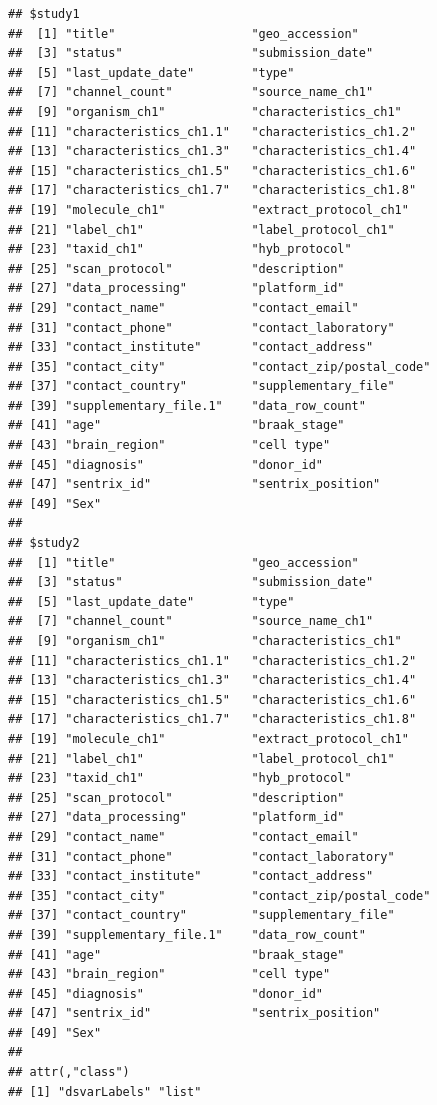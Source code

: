 \documentclass[
]{book}
\begin{document}
\begin{verbatim}
## $study1
##  [1] "title"                   "geo_accession"          
##  [3] "status"                  "submission_date"        
##  [5] "last_update_date"        "type"                   
##  [7] "channel_count"           "source_name_ch1"        
##  [9] "organism_ch1"            "characteristics_ch1"    
## [11] "characteristics_ch1.1"   "characteristics_ch1.2"  
## [13] "characteristics_ch1.3"   "characteristics_ch1.4"  
## [15] "characteristics_ch1.5"   "characteristics_ch1.6"  
## [17] "characteristics_ch1.7"   "characteristics_ch1.8"  
## [19] "molecule_ch1"            "extract_protocol_ch1"   
## [21] "label_ch1"               "label_protocol_ch1"     
## [23] "taxid_ch1"               "hyb_protocol"           
## [25] "scan_protocol"           "description"            
## [27] "data_processing"         "platform_id"            
## [29] "contact_name"            "contact_email"          
## [31] "contact_phone"           "contact_laboratory"     
## [33] "contact_institute"       "contact_address"        
## [35] "contact_city"            "contact_zip/postal_code"
## [37] "contact_country"         "supplementary_file"     
## [39] "supplementary_file.1"    "data_row_count"         
## [41] "age"                     "braak_stage"            
## [43] "brain_region"            "cell type"              
## [45] "diagnosis"               "donor_id"               
## [47] "sentrix_id"              "sentrix_position"       
## [49] "Sex"                    
## 
## $study2
##  [1] "title"                   "geo_accession"          
##  [3] "status"                  "submission_date"        
##  [5] "last_update_date"        "type"                   
##  [7] "channel_count"           "source_name_ch1"        
##  [9] "organism_ch1"            "characteristics_ch1"    
## [11] "characteristics_ch1.1"   "characteristics_ch1.2"  
## [13] "characteristics_ch1.3"   "characteristics_ch1.4"  
## [15] "characteristics_ch1.5"   "characteristics_ch1.6"  
## [17] "characteristics_ch1.7"   "characteristics_ch1.8"  
## [19] "molecule_ch1"            "extract_protocol_ch1"   
## [21] "label_ch1"               "label_protocol_ch1"     
## [23] "taxid_ch1"               "hyb_protocol"           
## [25] "scan_protocol"           "description"            
## [27] "data_processing"         "platform_id"            
## [29] "contact_name"            "contact_email"          
## [31] "contact_phone"           "contact_laboratory"     
## [33] "contact_institute"       "contact_address"        
## [35] "contact_city"            "contact_zip/postal_code"
## [37] "contact_country"         "supplementary_file"     
## [39] "supplementary_file.1"    "data_row_count"         
## [41] "age"                     "braak_stage"            
## [43] "brain_region"            "cell type"              
## [45] "diagnosis"               "donor_id"               
## [47] "sentrix_id"              "sentrix_position"       
## [49] "Sex"                    
## 
## attr(,"class")
## [1] "dsvarLabels" "list"
\end{verbatim}
\end{document}
